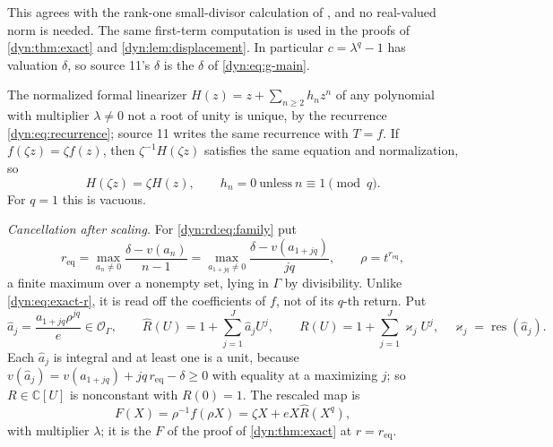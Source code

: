 \documentclass[11pt,letterpaper]{article}
\theoremstyle{definition}
\theoremstyle{remark}
\newcommand{\C}{\mathbb C}
\newcommand{\OO}{\mathcal O}
\newcommand{\res}{\operatorname{res}}
\numberwithin{equation}{section}
\begin{document}
This agrees with the rank-one small-divisor calculation of
\cite[Lemma~3.3]{Lindahl}, and no real-valued norm is needed. The same
first-term computation is used in the proofs of \cref{dyn:thm:exact} and
\cref{dyn:lem:displacement}. In particular $c=\lambda^{q}-1$ has valuation
$\delta$, so source 11's $\delta$ is the $\delta$ of \eqref{dyn:eq:g-main}.

The normalized formal linearizer $H(z)=z+\sum_{n\ge2}h_nz^{n}$ of any
polynomial with multiplier $\lambda\ne0$ not a root of unity is unique, by
the recurrence \eqref{dyn:eq:recurrence}; source 11 writes the same
recurrence with $T=f$. If $f(\zeta z)=\zeta f(z)$, then
$\zeta^{-1}H(\zeta z)$ satisfies the same equation and normalization, so
\begin{equation}\label{dyn:rd:eq:hsymmetry}
 H(\zeta z)=\zeta H(z),\qquad h_n=0\ \text{unless}\ n\equiv1\pmod q .
\end{equation}
For $q=1$ this is vacuous.

\emph{Cancellation after scaling.} For \eqref{dyn:rd:eq:family} put
\begin{equation}\label{dyn:rd:eq:req}
 r_{\mathrm{eq}}=\max_{a_n\ne0}\frac{\delta-v(a_n)}{n-1}
 =\max_{a_{1+jq}\ne0}\frac{\delta-v(a_{1+jq})}{jq},
 \qquad \rho=t^{r_{\mathrm{eq}}},
\end{equation}
a finite maximum over a nonempty set, lying in $\Gamma$ by divisibility.
Unlike \eqref{dyn:eq:exact-r}, it is read off the coefficients of $f$, not
of its $q$-th return. Put
\begin{equation}\label{dyn:rd:eq:R}
 \hat a_j=\frac{a_{1+jq}\rho^{jq}}{e}\in\OO_\Gamma,\qquad
 \widehat R(U)=1+\sum_{j=1}^{J}\hat a_jU^{j},\qquad
 R(U)=1+\sum_{j=1}^{J}\varkappa_jU^{j},\quad \varkappa_j=\res(\hat a_j).
\end{equation}
Each $\hat a_j$ is integral and at least one is a unit, because
$v(\hat a_j)=v(a_{1+jq})+jq\,r_{\mathrm{eq}}-\delta\ge0$ with equality at a
maximizing $j$; so $R\in\C[U]$ is nonconstant with $R(0)=1$. The rescaled
map is
\begin{equation}\label{dyn:rd:eq:F}
 F(X)=\rho^{-1}f(\rho X)=\zeta X+eX\widehat R(X^{q}),
\end{equation}
with multiplier $\lambda$; it is the $F$ of the proof of
\cref{dyn:thm:exact} at $r=r_{\mathrm{eq}}$.
\end{document}

